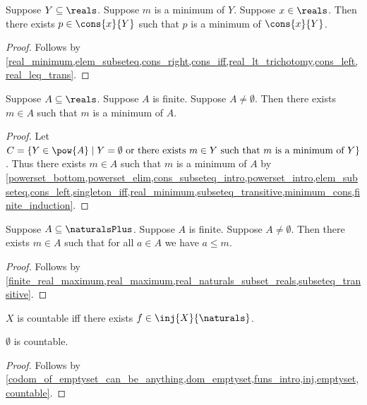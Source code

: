 \begin{lemma}\label{minimum_cons}
    Suppose $Y\subseteq\reals$.
    Suppose $m$ is a minimum of $Y$.
    Suppose $x\in\reals$.
    Then there exists $p\in\cons{x}{Y}$ such that $p$ is a minimum of $\cons{x}{Y}$.
\end{lemma}
\begin{proof}
    Follows by \cref{real_minimum,elem_subseteq,cons_right,cons_iff,real_lt_trichotomy,cons_left,real_leq_trans}.
\end{proof}

\begin{lemma}\label{finite_real_minimum}
    Suppose $A\subseteq\reals$.
    Suppose $A$ is finite.
    Suppose $A\neq \emptyset$.
    Then there exists $m\in A$ such that $m$ is a minimum of $A$.
\end{lemma}
\begin{proof}
    Let $C=\{Y\in\pow{A}\mid \text{$Y=\emptyset$ or there exists $m\in Y$ such that $m$ is a minimum of $Y$}\}$.
    Thus there exists $m\in A$ such that $m$ is a minimum of $A$ by \cref{powerset_bottom,powerset_elim,cons_subseteq_intro,powerset_intro,elem_subseteq,cons_left,singleton_iff,real_minimum,subseteq_transitive,minimum_cons,finite_induction}.
\end{proof}

\begin{lemma}\label{finite_naturals_maximum}
    Suppose $A\subseteq\naturalsPlus$.
    Suppose $A$ is finite.
    Suppose $A\neq \emptyset$.
    Then there exists $m\in A$ such that for all $a\in A$ we have $a \leq m$.
\end{lemma}
\begin{proof}
    Follows by \cref{finite_real_maximum,real_maximum,real_naturals_subset_reals,subseteq_transitive}.
\end{proof}

\begin{definition}\label{countable}
    $X$ is countable iff there exists $f\in\inj{X}{\naturals}$.
\end{definition}

\begin{lemma}\label{emptyset_is_countable}
    $\emptyset$ is countable.
\end{lemma}
\begin{proof}
    Follows by \cref{codom_of_emptyset_can_be_anything,dom_emptyset,funs_intro,inj,emptyset,countable}.
\end{proof}

